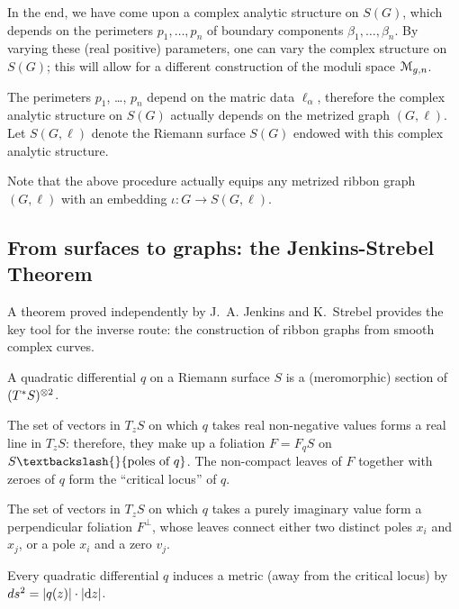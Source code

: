 In the end, we have come upon a complex analytic structure on $S(G)$,
which depends on the perimeters $p_1, \ldots, p_n$ of boundary components
$\beta_1, \ldots, \beta_n$. By varying these (real positive) parameters, one can
vary the complex structure on $S(G)$; this will allow for a different
construction of the moduli space $\mathcal{M}_{g,n}$.

The perimeters $p_1$, \ldots, $p_n$ depend on the matric data $\ell_\alpha$,
therefore the complex analytic structure on $S(G)$ actually depends on
the metrized graph $(G, \ell)$.  Let $S(G, \ell)$ denote the Riemann
surface $S(G)$ endowed with this complex analytic structure.

\begin{remark}
  Note that the above procedure actually equips any metrized ribbon
  graph $(G, \ell)$ with an embedding $\iota: G \to S(G, \ell)$.
\end{remark}


\subsection{From surfaces to graphs: the Jenkins-Strebel Theorem}
\label{sec:strebel}
A theorem proved independently by J.~A. Jenkins \cite{jenkins;annals}
and K.~Strebel \cite{strebel;quadratic-differentials;1983} provides
the key tool for the inverse route: the construction of ribbon graphs
from smooth complex curves.

\begin{definition}
  A quadratic differential $q$ on a Riemann surface $S$ is a
  (meromorphic) section of $(T^*S)\sp{\otimes 2}$.
\end{definition}
The set of vectors in $T_zS$ on which $q$ takes real non-negative
values forms a real line in $T_zS$: therefore, they make up a
foliation $F = F_qS$ on $S \textbackslash{} \{\text{poles of $q$}\}$. The non-compact
leaves of $F$ together with zeroes of $q$ form the ``critical locus''
of $q$.  

The set of vectors in $T_zS$ on which $q$ takes a purely imaginary
value form a perpendicular foliation $F^\perp$, whose leaves connect
either two distinct poles $x_i$ and $x_j$, or a pole $x_i$ and a zero
$v_j$.

Every quadratic differential $q$ induces a metric (away from the
critical locus) by $ds^2 = \lvert q(z)\rvert \cdot \lvert\mathrm{d} z\rvert$.

